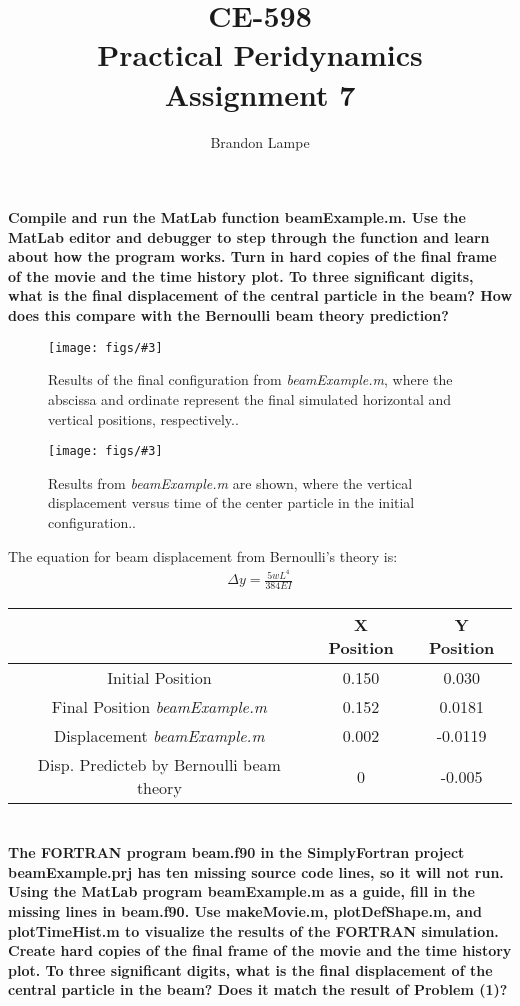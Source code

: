 \documentclass[letterpaper, 10pt, oneside]{article}
\title{CE-598\\ Practical Peridynamics\\ Assignment 7}
\author{Brandon Lampe}
\newenvironment{dd}[1]{
	\noindent
	\textbf{\normalsize{#1}}
	\hspace{0.1in}
	\small
	\rmfamily
	}
	{\medskip}
\newcommand{\as}[1]{\begin{align*}#1\end{align*}}
\newcommand{\bdd}{\begin{dd}}
\newcommand{\edd}{\end{dd}}
\newcommand{\Figure}[4]{
  \begin{figure}[#1]
    \centering
    \texttt{[image: figs/\#3]}
    \caption{#4.}\label{fig:#3}
  \end{figure}}
\begin{document}
\maketitle
\section{}
\bdd{Compile and run the MatLab function beamExample.m. Use the MatLab editor and debugger to step through the function and learn about how the program works. Turn in hard copies of the final frame of the movie and the time history plot. To three significant digits, what is the final displacement of the central particle in the beam? How does this compare with the Bernoulli beam theory prediction?}

\Figure{htp}{4}{1_def.pdf}{Results of the final configuration from \emph{beamExample.m}, where the abscissa and ordinate represent the final simulated horizontal and vertical positions, respectively.}

\Figure{htp}{4}{1_Hist.pdf}{Results from \emph{beamExample.m} are shown, where the vertical displacement versus time of the center particle in the initial configuration.}

The equation for beam displacement from Bernoulli's theory is:
\as{\Delta y = \frac{5wL^{4}}{384EI}}

\begin{center}\begin{tabular}{c c c}
	& X Position & Y Position\\
	\hline
	Initial Position & 0.150 & 0.030 \\
	\hline
	Final Position \emph{beamExample.m} & 0.152 & 0.0181 \\
	\hline
	Displacement \emph{beamExample.m} & 0.002 & -0.0119\\
	\hline
	Disp. Predicteb by Bernoulli beam theory & 0 & -0.005 \\
	\hline
\end{tabular}\end{center}
\edd

\section{}
\bdd{The FORTRAN program beam.f90 in the SimplyFortran project beamExample.prj has ten missing source code lines, so it will not run. Using the MatLab program beamExample.m as a guide, fill in the missing lines in beam.f90. Use makeMovie.m, plotDefShape.m, and plotTimeHist.m to visualize the results of the FORTRAN simulation. Create hard copies of the final frame of the movie and the time history plot. To three significant digits, what is the final displacement of the central particle in the beam? Does it match the result of Problem (1)?}
\end{document}
